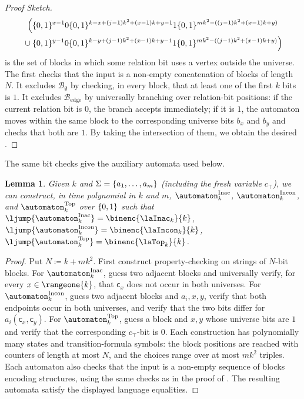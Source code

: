 \documentclass[10pt,a4paper]{article}
\newtheorem{lemma}[theorem]{Lemma}
\theoremstyle{definition}
\theoremstyle{remark}
\DeclarePairedDelimiter\set{\{}{\}}
\newcommand{\const}[1]{\mathsf{#1}}
\newcommand{\defeq}{\coloneq}
\newcommand{\vsig}{\Sigma}
\begin{document}
\begin{proof}[Proof Sketch]
\begin{align*}
        \Big(&
        \set{0,1}^{x-1}0
        \set{0,1}^{k-x+(j-1)k^2+(x-1)k+y-1}
        1
        \set{0,1}^{mk^2-((j-1)k^2+(x-1)k+y)}
        \\
        {}\cup{}&
        \set{0,1}^{y-1}0
        \set{0,1}^{k-y+(j-1)k^2+(x-1)k+y-1}
        1
        \set{0,1}^{mk^2-((j-1)k^2+(x-1)k+y)}
        \Big)
    \end{align*}
    is the set of blocks in which some relation bit uses a vertex outside the universe.
    The  first checks that the input is a non-empty concatenation of blocks of length $N$.
    It excludes $\mathcal{B}_{\emptyset}$ by checking, in every block, that at least one of the first $k$ bits is $1$.
    It excludes $\mathcal{B}_{\mathrm{edge}}$ by universally branching over relation-bit positions:
    if the current relation bit is $0$, the branch accepts immediately;
    if it is $1$, the automaton moves within the same block to the corresponding universe bits $b_x$ and $b_y$ and checks that both are $1$.
    By taking the intersection of them, we obtain the desired .
\end{proof}

The same bit checks give the auxiliary automata used below.
\begin{lemma}\label{lemma: binary auxiliary languages}
Given $k$ and $\vsig=\set{a_1,\dots,a_m}$ (including the fresh variable $c_{\top}$),
we can construct, in time polynomial in $k$ and $m$, 
$\automaton_k^{\mathrm{Inac}}$, $\automaton_k^{\mathrm{Incon}}$, and
$\automaton_k^{\mathrm{Top}}$ over $\set{0,1}$ such that
$\ljump{\automaton_k^{\mathrm{Inac}}}=\binenc{\laInac_k}{k}$,
$\ljump{\automaton_k^{\mathrm{Incon}}}=\binenc{\laIncon_k}{k}$,
$\ljump{\automaton_k^{\mathrm{Top}}}=\binenc{\laTop_k}{k}$.
\end{lemma}
\begin{proof}
Put $N\defeq k+mk^2$.
First construct property-checking  on strings of $N$-bit blocks.
For $\automaton_k^{\mathrm{Inac}}$, guess two adjacent blocks and universally verify,
for every $x\in\rangeone{k}$, that $\const{c}_x$ does not occur in both universes.
For $\automaton_k^{\mathrm{Incon}}$, guess two adjacent blocks and $a_i,x,y$,
verify that both endpoints occur in both universes, and verify that the two bits differ for
$a_i(\const{c}_x,\const{c}_y)$.
For $\automaton_k^{\mathrm{Top}}$, guess a block and $x,y$ whose universe bits are $1$
and verify that the corresponding $c_{\top}$-bit is $0$.
Each construction has polynomially many states and transition-formula symbols:
the block positions are reached with counters of length at most $N$, and the choices range over
at most $m k^2$ triples.
Each automaton also checks that the input is a non-empty sequence of blocks encoding
structures, using the same checks as in the proof of .
The resulting automata satisfy the displayed language equalities.
\end{proof}
\end{document}
